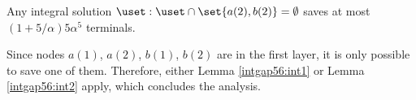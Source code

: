 \begin{lemma} 
Any integral solution $\uset: \uset \cap \set{a(2), b(2)} =\emptyset$ saves at most $(1+5/\alpha) 5 \alpha^5$ terminals.
\label{intgap56:int2}
\end{lemma} 


Since nodes $a(1)$, $a(2)$, $b(1)$, $b(2)$ are in the first layer, it is only
possible to save one of them. Therefore, either Lemma \ref{intgap56:int1} or
Lemma \ref{intgap56:int2} apply, which concludes the analysis.
